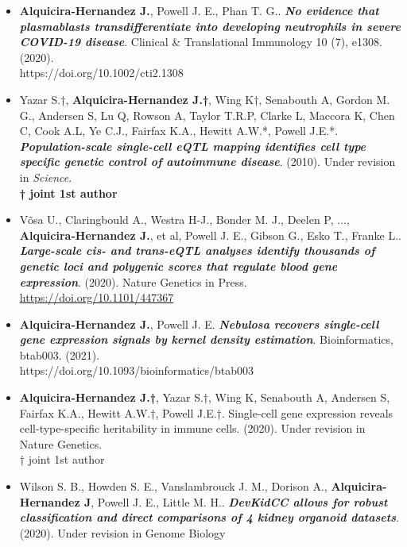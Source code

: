 \begin{itemize}

\item{\textbf{Alquicira-Hernandez J.}, Powell J. E., Phan T. G.. \textbf{\textit{No evidence that plasmablasts transdifferentiate into developing neutrophils in severe COVID-19 disease}}. Clinical & Translational Immunology 10 (7), e1308. (2020). \\
https://doi.org/10.1002/cti2.1308}

\item{Yazar S.†, \textbf{Alquicira-Hernandez J.†}, Wing K†, Senabouth A, Gordon M. G., Andersen S, Lu Q, Rowson A, Taylor T.R.P, Clarke L, Maccora K, Chen C, Cook A.L, Ye C.J., Fairfax K.A., Hewitt A.W.*, Powell J.E.*. \textbf{\textit{Population-scale single-cell eQTL mapping identifies cell type specific genetic control of autoimmune disease}}. (2010). Under revision in \textit{Science}. \\
\textbf{† joint 1st author}}

\item{Võsa U., Claringbould A., Westra H-J., Bonder M. J., Deelen P, ..., \textbf{Alquicira-Hernandez J.}, et al, Powell J. E., Gibson G., Esko T., Franke L.. \textbf{\textit{Large-scale cis- and trans-eQTL analyses identify thousands of genetic loci and polygenic scores that regulate blood gene expression}}. (2020).
Nature Genetics in Press. \\
\url{https://doi.org/10.1101/447367}}

\item{\textbf{Alquicira-Hernandez J.}, Powell J. E. \textbf{\textit{Nebulosa recovers single-cell gene expression signals by kernel density estimation}}.
Bioinformatics, btab003. (2021). \\
https://doi.org/10.1093/bioinformatics/btab003}

\item{\textbf{Alquicira-Hernandez J.†}, Yazar S.†, Wing K, Senabouth A, Andersen S, Fairfax K.A., Hewitt A.W.†, Powell J.E.†. Single-cell gene expression reveals cell-type-specific heritability in immune cells. (2020). Under revision in Nature Genetics. \\
† joint 1st author}

\item{Wilson S. B., Howden S. E., Vanslambrouck J. M., Dorison A., \textbf{Alquicira-Hernandez J}, Powell J. E., Little M. H.. \textbf{\textit{DevKidCC allows for robust classification and direct comparisons of 4 kidney organoid datasets}}. (2020). Under revision in Genome Biology}



\end{itemize}
